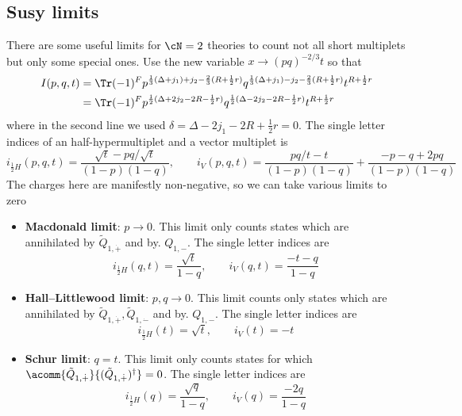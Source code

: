 \subsection{Susy limits}
There are some useful limits for $\cN=2$ theories to count not all short multiplets but only some special ones. Use the new variable $x\rightarrow (pq)^{-2/3}t$ so that
\begin{equation}
\begin{split}
	I(p,q,t)&=\Tr (-1)^{F}p^{\frac{1}{3}(\Delta+j_{1})+j_{2}-\frac{2}{3} (R+\frac{1}{2} r)}q^{\frac{1}{3}(\Delta+j_{1})-j_{2}-\frac{2}{3}(R+\frac{1}{2}r)}t^{R+\frac{1}{2}r}\\
	&=\Tr (-1)^{F}p^{\frac{1}{2}(\Delta+2j_{2}-2R-\frac{1}{2}r)}q^{\frac{1}{2}(\Delta-2j_{2}-2R-\frac{1}{2}r)}t^{R+\frac{1}{2}r}
\end{split}
\end{equation}
where in the second line we used $\delta=\Delta-2j_{1}-2R+\frac{1}{2}r=0$. The single letter indices of an half-hypermultiplet and a vector multiplet is
\begin{equation}
	i_{\frac{1}{2}H}(p,q,t)=\frac{\sqrt{t}-pq/\sqrt{t}}{(1-p)(1-q)},\qquad i_{V}(p,q,t)=\frac{pq/t-t}{(1-p)(1-q)}+\frac{-p-q+2pq}{(1-p)(1-q)}
\end{equation}
The charges here are manifestly non-negative, so we can take various limits to zero
\begin{itemize}
	\item \textbf{Macdonald limit}: $p\rightarrow 0$. This limit only counts states which are annihilated by $\tilde Q_{1,\dot{+}}$ and by. $Q_{1,-}$. The single letter indices are
	\begin{equation}
		i_{\frac{1}{2}H}(q,t)=\frac{\sqrt{t}}{1-q},\qquad i_{V}(q,t)=\frac{-t-q}{1-q}
	\end{equation}
	\item \textbf{Hall--Littlewood limit}: $p,q\rightarrow0$. This limit counts only states which are annihilated by $\tilde Q_{1,\dot{+}},\tilde{Q}_{1,\dot{-}}$ and by. $Q_{1,-}$. The single letter indices are
	\begin{equation}
		i_{\frac{1}{2}H}(t)=\sqrt{t},\qquad i_{V}(t)=-t
	\end{equation}
	\item \textbf{Schur limit}: $q=t$. This limit only counts states for which $\acomm{\tilde{Q}_{1,\dot{+}}}{(\tilde{Q}_{1,\dot{+}})^{\dagger}}=0$. The single letter indices are
	\begin{equation}
		i_{\frac{1}{2}H}(q)=\frac{\sqrt{q}}{1-q},\qquad i_{V}(q)=\frac{-2q}{1-q}
	\end{equation}
\end{itemize}
